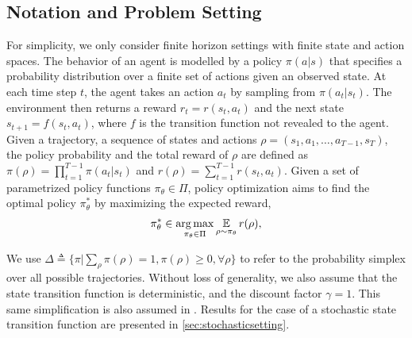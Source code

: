 \subsection{Notation and Problem Setting}
\label{subsec:notations_and_settings}

For simplicity, we only consider finite horizon
settings with finite state and action spaces. 
The behavior of an agent is modelled by a policy $\pi(a|s)$
that specifies a probability distribution over a finite set of actions
given an observed state. 
At each time step $t$, the agent takes an action $a_t$ by sampling from
$\pi(a_t | s_t)$.
The environment then returns a reward $r_t = r(s_t, a_t)$ and the next state
$s_{t+1} = f(s_t, a_t)$,
where $f$ is the transition function not revealed to the agent.
Given a trajectory, a sequence of states and actions
$\rho=(s_1, a_1, \dots, a_{T-1}, s_T)$,
the policy probability and the total reward of $\rho$ are defined as
$\pi(\rho) = \prod_{t=1}^{T-1} \pi(a_t| s_t)$
 and $r(\rho) = \sum_{t=1}^{T-1} r(s_t, a_t)$. 
Given a set of parametrized policy functions $\pi_\theta \in \Pi$,
policy optimization aims to find the optimal policy $\pi_\theta^*$
by maximizing the expected reward,
\begin{equation}
\label{max_expected_reward}
\begin{split}
\pi_\theta^* \in \operatorname*{arg\,max}_{\pi_\theta \in \Pi}{ \operatorname*{\mathbb{E}}\limits_{\rho \sim \pi_\theta}{r(\rho)} },
\end{split}
\end{equation}

We use
$\Delta \triangleq \{ \pi | \sum_{\rho}{\pi(\rho)} = 1, \pi(\rho) \ge 0,
\forall \rho \}$
to refer to the probability simplex over all possible trajectories. 
Without loss of generality, we also assume that the state transition function
is deterministic, and the discount factor $\gamma = 1$.
This same simplification is also assumed in \citet{nachum2017improving}. 
Results for the case of a stochastic state transition function are presented
in \cref{sec:stochasticsetting}.
